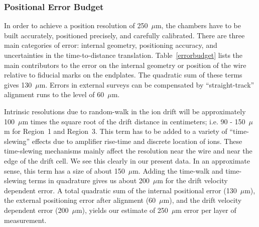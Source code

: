 \subsubsection{Positional Error Budget}

In order to achieve a position resolution of 250~$\mu$m, the chambers have to 
be built accurately, positioned precisely, and carefully calibrated.   There 
are three main categories of error: internal geometry, positioning accuracy,
and uncertainties in the time-to-distance translation.
Table~\ref{errorbudget} lists the main contributors to the error on the 
internal geometry or position of the wire relative to fiducial marks on the 
endplates.  The quadratic sum of these terms gives 130~$\mu$m.  Errors in 
external surveys can be compensated by ``straight-track'' alignment runs to 
the level of 60~$\mu$m.  

Intrinsic resolutions due to random-walk in the ion drift will be 
approximately 100~$\mu$m times the square root of the drift distance in 
centimeters; i.e. 90 - 150~$\mu$m for Region~1 and Region~3.  This term has 
to be added to a variety of ``time-slewing'' effects due to amplifier 
rise-time and discrete location of ions.  These time-slewing mechanisms 
mainly affect the resolution near the wire and near the edge of the drift 
cell.  We see this clearly in our present data.  In an approximate sense, 
this term has a size of about 150~$\mu$m.  Adding the time-walk and 
time-slewing terms in quadrature gives us about 200~$\mu$m for the drift 
velocity dependent error.  A total quadratic sum of the internal positional 
error (130~$\mu$m), the external positioning error after alignment (60~$\mu$m),
and the drift velocity dependent error (200~$\mu$m), yields our estimate of 
250~$\mu$m error per layer of measurement.   


